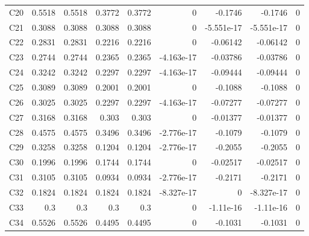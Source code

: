 \documentclass[10pt]{article}
\begin{document}
\begin{longtable}{@{}lrrrrrrrr@{}}
C20 & 0.5518 & 0.5518 & 0.3772 & 0.3772 & 0 & -0.1746 & -0.1746 & 0\\[1pt]
C21 & 0.3088 & 0.3088 & 0.3088 & 0.3088 & 0 & -5.551e-17 & -5.551e-17 & 0\\[1pt]
C22 & 0.2831 & 0.2831 & 0.2216 & 0.2216 & 0 & -0.06142 & -0.06142 & 0\\[1pt]
C23 & 0.2744 & 0.2744 & 0.2365 & 0.2365 & -4.163e-17 & -0.03786 & -0.03786 & 0\\[1pt]
C24 & 0.3242 & 0.3242 & 0.2297 & 0.2297 & -4.163e-17 & -0.09444 & -0.09444 & 0\\[1pt]
C25 & 0.3089 & 0.3089 & 0.2001 & 0.2001 & 0 & -0.1088 & -0.1088 & 0\\[1pt]
C26 & 0.3025 & 0.3025 & 0.2297 & 0.2297 & -4.163e-17 & -0.07277 & -0.07277 & 0\\[1pt]
C27 & 0.3168 & 0.3168 & 0.303 & 0.303 & 0 & -0.01377 & -0.01377 & 0\\[1pt]
C28 & 0.4575 & 0.4575 & 0.3496 & 0.3496 & -2.776e-17 & -0.1079 & -0.1079 & 0\\[1pt]
C29 & 0.3258 & 0.3258 & 0.1204 & 0.1204 & -2.776e-17 & -0.2055 & -0.2055 & 0\\[1pt]
C30 & 0.1996 & 0.1996 & 0.1744 & 0.1744 & 0 & -0.02517 & -0.02517 & 0\\[1pt]
C31 & 0.3105 & 0.3105 & 0.0934 & 0.0934 & -2.776e-17 & -0.2171 & -0.2171 & 0\\[1pt]
C32 & 0.1824 & 0.1824 & 0.1824 & 0.1824 & -8.327e-17 & 0 & -8.327e-17 & 0\\[1pt]
C33 & 0.3 & 0.3 & 0.3 & 0.3 & 0 & -1.11e-16 & -1.11e-16 & 0\\[1pt]
C34 & 0.5526 & 0.5526 & 0.4495 & 0.4495 & 0 & -0.1031 & -0.1031 & 0\\[1pt]
\end{longtable}\normalsize
\end{document}
